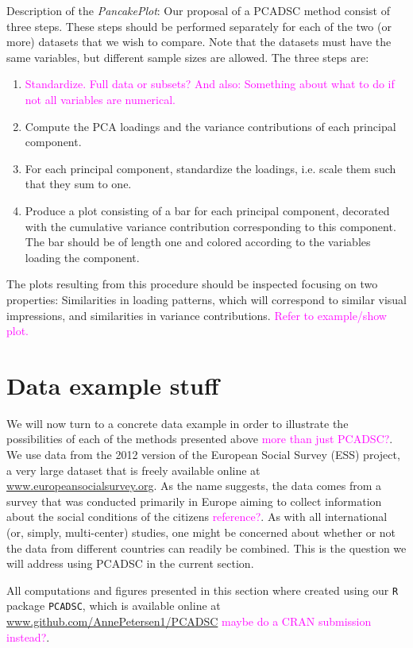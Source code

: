 \documentclass[titlepage,11pt,twoside]{article}
\newcommand{\hl}[1]{\textcolor{magenta}{#1}}
\newcommand{\R}[1]{\texttt{#1}}
\begin{document}
Description of the \emph{PancakePlot}: Our proposal of a PCADSC method consist of three steps. These steps should be performed separately for each of the two (or more) datasets that we wish to compare. Note that the datasets must have the same variables, but different sample sizes are allowed. The three steps are:
\begin{enumerate}
\item \hl{Standardize. Full data or subsets? And also: Something about what to do if not all variables are numerical.}
\item Compute the PCA loadings and the variance contributions of each principal component.
\item For each principal component, standardize the loadings, i.e. scale them such that they sum to one.
\item Produce a plot consisting of a bar for each principal component, decorated with the cumulative variance contribution corresponding to this component. The bar should be of length one and colored according to the variables loading the component.
\end{enumerate}
The plots resulting from this procedure should be inspected focusing on two properties: Similarities in loading patterns, which will correspond to similar visual impressions, and similarities in variance contributions.  \hl{Refer to example/show plot.}




\section{Data example stuff}
\label{sec:dataexample}
We will now turn to a concrete data example in order to illustrate the possibilities of each of the methods presented above \hl{more than just PCADSC?}. We use data from the 2012 version of the European Social Survey (ESS) project, a very large dataset that is freely available online at \url{www.europeansocialsurvey.org}. As the name suggests, the data comes from a survey that was conducted primarily in Europe aiming to collect information about the social conditions of the citizens \hl{reference?}. As with all international (or, simply, multi-center) studies, one might be concerned about whether or not the data from different countries can readily be combined. This is the question we will address using PCADSC in the current section.

All computations and figures presented in this section where created using our \R{R} package \R{PCADSC}, which is available online at \url{www.github.com/AnnePetersen1/PCADSC} \hl{maybe do a CRAN submission instead?}.
\end{document}
